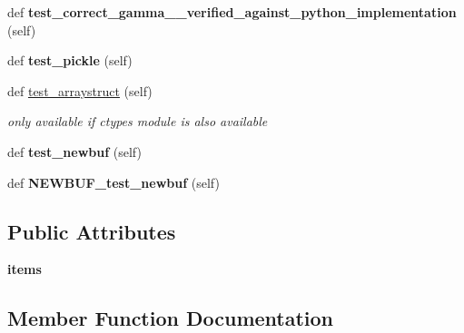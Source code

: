\begin{DoxyCompactItemize}
def {\bfseries test\+\_\+correct\+\_\+gamma\+\_\+\+\_\+verified\+\_\+against\+\_\+python\+\_\+implementation} (self)
\item 
\mbox{\label{classpygame_1_1tests_1_1color__test_1_1_color_type_test_af00743c58ddf59eb1857a80d18538804}} 
def {\bfseries test\+\_\+pickle} (self)
\item 
\mbox{\label{classpygame_1_1tests_1_1color__test_1_1_color_type_test_a49ecfebdc93c77c60f42a5f166d294a9}} 
def \hyperlink{classpygame_1_1tests_1_1color__test_1_1_color_type_test_a49ecfebdc93c77c60f42a5f166d294a9}{test\+\_\+arraystruct} (self)
\begin{DoxyCompactList}\small\item\em only available if ctypes module is also available \end{DoxyCompactList}\item 
\mbox{\label{classpygame_1_1tests_1_1color__test_1_1_color_type_test_ac48d5e654b6b8b29fad9d56747ac42c9}} 
def {\bfseries test\+\_\+newbuf} (self)
\item 
\mbox{\label{classpygame_1_1tests_1_1color__test_1_1_color_type_test_a8b8a45d9a03c6de0747c4b4e3fdda934}} 
def {\bfseries N\+E\+W\+B\+U\+F\+\_\+test\+\_\+newbuf} (self)
\end{DoxyCompactItemize}
\subsection*{Public Attributes}
\begin{DoxyCompactItemize}
\item 
\mbox{\label{classpygame_1_1tests_1_1color__test_1_1_color_type_test_a06d4a245820bc3df98cfc27a99f9ef55}} 
{\bfseries items}
\end{DoxyCompactItemize}


\subsection{Member Function Documentation}
\mbox{\label{classpygame_1_1tests_1_1color__test_1_1_color_type_test_af71b0b1864459c4c0af931dece53c73b}} 
